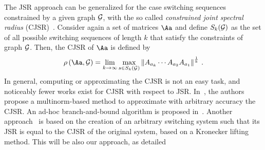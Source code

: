 The JSR approach can be generalized for the case  switching
sequences  constrained by a given graph $\mathcal{G}_{}$, with the so called
\emph{constrained joint spectral  radius} (CJSR)~\cite{dai2012gelfand}. Consider again a set of matrices
$\Aa$ and define ${S}_k(\mathcal{G}_{})$ as the set
of all possible switching sequences  of length $k$ that satisfy the
constraints of graph $\mathcal{G}_{}$. Then, the CJSR of $\Aa$ is defined by
\begin{equation}
\label{cjsr}
    \rho\left(\Aa,\GG{}\right)= \lim_{k\rightarrow\infty}
    \max_{s\in{S}_k(\GG{})} \norm{A_{a_k}
    \cdots A_{a_2}A_{a_1}}^{\frac{1}{k}} \,.
\end{equation}
In general, computing or approximating the
CJSR is not an easy task, and noticeably fewer works exist for CJSR with respect to JSR. In~\cite{philippe2016stability}, the authors propose a
multinorm-based method to approximate with arbitrary accuracy the
CJSR. An ad-hoc branch-and-bound algorithm is proposed
in~\cite{dercole2017simple}.
Another approach~\cite{kozyakin2014berger, wang2014stability, xu2020approximation} is based on the creation of an arbitrary switching system such that its JSR is equal to the CJSR of the original system, based on a Kronecker lifting method.
This will be also our approach, as detailed  


